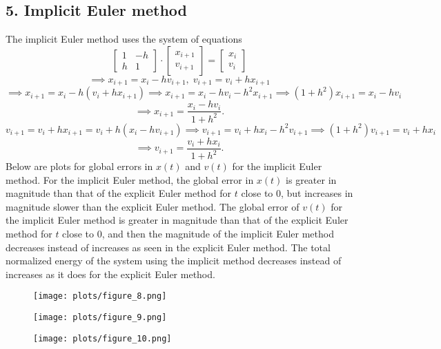 \documentclass{article}
\begin{document}
\subsection*{5. Implicit Euler method}
The implicit Euler method uses the system of equations
\[ \begin{bmatrix}
1 & -h\\
h & 1
\end{bmatrix}
\cdot
\begin{bmatrix}
x_{i+1}\\
v_{i+1}
\end{bmatrix}
=
\begin{bmatrix}
x_{i}\\
v_{i}
\end{bmatrix} \]
\[ \implies x_{i+1} = x_i - hv_{i+1},\; v_{i+1} = v_i + hx_{i+1} \]
\[ \implies x_{i+1} = x_i - h(v_i + hx_{i+1}) \implies x_{i+1} = x_i - hv_i - h^2 x_{i+1} \implies (1 + h^2)x_{i+1} = x_i - hv_i \]
\[ \implies x_{i+1} = \dfrac{x_i - hv_i}{1 + h^2}. \]
\[ v_{i+1} = v_i + hx_{i+1} = v_i + h(x_i - hv_{i+1}) \implies v_{i+1} = v_i + hx_i - h^2 v_{i+1} \implies (1 + h^2)v_{i+1} = v_i + hx_i \]
\[ \implies v_{i+1} = \dfrac{v_i + hx_i}{1 + h^2}. \]
Below are plots for global errors in $x(t)$ and $v(t)$ for the implicit Euler method. For the implicit Euler method, the global error in $x(t)$ is greater in magnitude than that of the explicit Euler method for $t$ close to 0, but increases in magnitude slower than the explicit Euler method. The global error of $v(t)$ for the implicit Euler method is greater in magnitude than that of the explicit Euler method for $t$ close to 0, and then the magnitude of the implicit Euler method decreases instead of increases as seen in the explicit Euler method. The total normalized energy of the system using the implicit method decreases instead of increases as it does for the explicit Euler method.

\begin{figure}[H]
\centering
\texttt{[image: plots/figure\_8.png]}
\end{figure}

\begin{figure}[H]
\centering
\texttt{[image: plots/figure\_9.png]}
\end{figure}

\begin{figure}[H]
\centering
\texttt{[image: plots/figure\_10.png]}
\end{figure}
\end{document}
